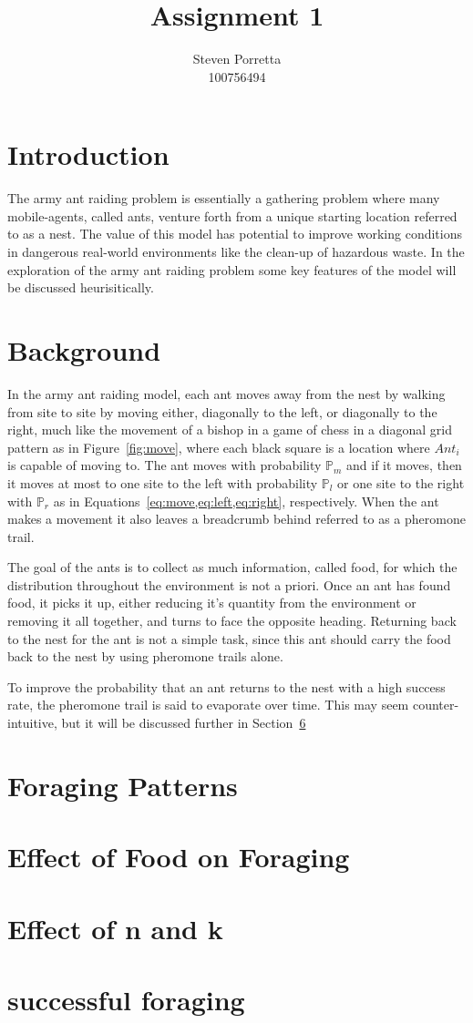 \documentclass{article}
\title{Assignment 1}
\date{}
\author{Steven Porretta \\ 100756494}
\begin{document}
\section{Introduction}
	The army ant raiding problem is essentially a gathering problem where many mobile-agents, called ants, venture forth from a unique starting location referred to as a nest. The value of this model has potential to improve working conditions in dangerous real-world environments like the clean-up of hazardous waste. In the exploration of the army ant raiding problem some key features of the model will be discussed heurisitically.

\section{Background}
	In the army ant raiding model, each ant moves away from the nest by walking from site to site by moving either, diagonally to the left, or diagonally to the right, much like the movement of a bishop in a game of chess in a diagonal grid pattern as in Figure~\ref{fig:move}, where each black square is a location where $Ant_i$ is capable of moving to. The ant moves with probability $\mathbb{P}_m$ and if it moves, then it moves at most to one site to the left with probability $\mathbb{P}_l$ or one site to the right with $\mathbb{P}_r$ as in Equations~\eqref{eq:move,eq:left,eq:right}, respectively. When the ant makes a movement it also leaves a breadcrumb behind referred to as a pheromone trail.

	The goal of the ants is to collect as much information, called food, for which the distribution throughout the environment is not a priori. Once an ant has found food, it picks it up, either reducing it's quantity from the environment or removing it all together, and turns to face the opposite heading. Returning back to the nest for the ant is not a simple task, since this ant should carry the food back to the nest by using pheromone trails alone.

	To improve the probability that an ant returns to the nest with a high success rate, the pheromone trail is said to evaporate over time. This may seem counter-intuitive, but it will be discussed further in Section~\ref{sec:suc}

\section{Foraging Patterns}
\section{Effect of Food on Foraging} \label{sec:food}
\section{Effect of n and k}\label{sec:nandk}
\section{successful foraging}\label{sec:suc}
\end{document}
